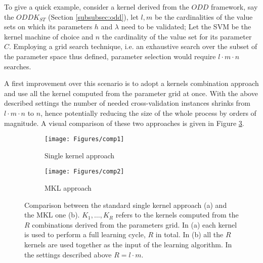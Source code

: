 
To give a quick example, consider a kernel derived from the $ODD$ framework, say
the $ODDK_{ST}$ (Section \ref{subsubsec:odd}), let $l,m$ be the cardinalities of the value sets on which its parameters
$h$ and $\lambda$ need to be validated; Let the SVM be the kernel machine of choice and
$n$ the cardinality of the value set for its parameter $C$.
Employing a grid search technique, i.e. an exhaustive search over the subset
of the parameter space thus defined, parameter selection would require $l\cdot m\cdot n$
searches.

A first improvement over this scenario is to adopt a kernels combination approach 
and use all the kernel computed from the parameter grid at once.
With the above described settings the number of needed cross-validation instances
shrinks from $l\cdot m\cdot n$ to $n$, hence potentially reducing the size of the
whole process by orders of magnitude.
A visual comparison of these two approaches is given in Figure \ref{fig:comparison}.

\begin{figure}[h]
    \centering
    \begin{subfigure}{.391\textwidth}
        \centering
        \texttt{[image: Figures/comp1]}
        \caption{Single kernel approach}
        \label{fig:comp1}
    \end{subfigure}\qquad
    \begin{subfigure}{.4\textwidth}
        \centering
        \texttt{[image: Figures/comp2]}
        \caption{MKL approach}
        \label{fig:comp2}
    \end{subfigure}
    \caption{Comparison between the standard single kernel approach (a) and the MKL one (b).
    $K_1,\dots,K_R$ refers to the kernels computed from the $R$ combinations
    derived from the parameters grid. In (a) each kernel is used to perform a full learning
    cycle, $R$ in total. In (b) all the $R$ kernels are used together
    as the input of the learning algorithm.
    In the settings described above $R=l\cdot m$.}
    \label{fig:comparison}
\end{figure}


